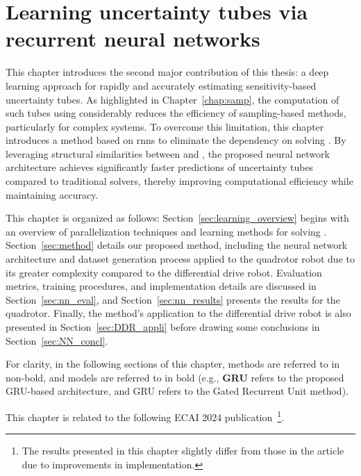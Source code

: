 \chapter{Learning uncertainty tubes via recurrent neural networks} \label{chap:NN}
\localtableofcontents \newpage

This chapter introduces the second major contribution of this thesis: a deep learning approach for rapidly and accurately estimating sensitivity-based uncertainty tubes. 
As highlighted in Chapter~\ref{chap:samp}, the computation of such tubes using  considerably reduces the efficiency of sampling-based methods, particularly for complex systems.
To overcome this limitation, this chapter introduces a method based on \gls{rnns} to eliminate the dependency on solving .
By leveraging structural similarities between  and , the proposed neural network architecture achieves significantly faster predictions of uncertainty tubes compared to traditional solvers, thereby improving computational efficiency while maintaining accuracy.

This chapter is organized as follows: Section~\ref{sec:learning_overview} begins with an overview of parallelization techniques and learning methods for solving .
Section~\ref{sec:method} details our proposed method, including the neural network architecture and dataset generation process applied to the quadrotor robot due to its greater complexity compared to the differential drive robot. 
Evaluation metrics, training procedures, and implementation details are discussed in Section~\ref{sec:nn_eval}, and Section~\ref{sec:nn_results} presents the results for the quadrotor. 
Finally, the method's application to the differential drive robot is also presented in Section~\ref{sec:DDR_appli} before drawing some conclusions in Section~\ref{sec:NN_concl}.

For clarity, in the following sections of this chapter, methods are referred to in non-bold, and models are referred to in bold (e.g., \textbf{GRU} refers to the proposed GRU-based architecture, and GRU refers to the Gated Recurrent Unit method).

This chapter is related to the following ECAI 2024 publication~\cite{cECAI}\footnote{The results presented in this chapter slightly differ from those in the article due to improvements in implementation.}.

